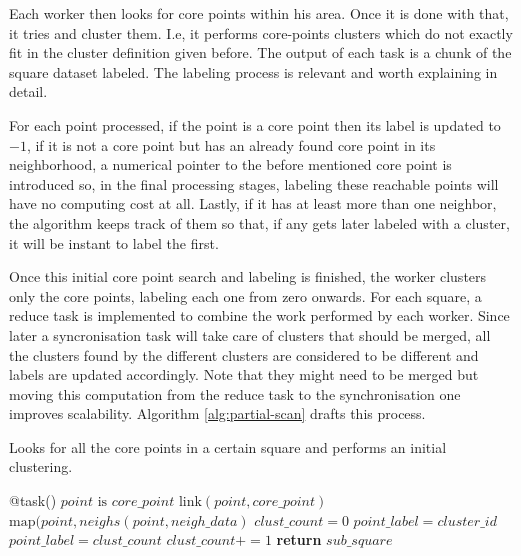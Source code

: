 \documentclass[10pt,journal,compsoc]{IEEEtran}
\let\MYoriglatexcaption\caption
\renewcommand{\caption}[2][\relax]{\MYoriglatexcaption[#2]{#2}}
\begin{document}
Each worker then looks for core points within his area. Once it is done with that, it tries and cluster them. I.e, it performs core-points clusters which do not exactly fit in the cluster definition given before. The output of each task is a chunk of the square dataset labeled. The labeling process is relevant and worth explaining in detail.

For each point processed, if the point is a core point then its label is updated to $-1$, if it is not a core point but has an already found core point in its neighborhood, a numerical pointer to the before mentioned core point is introduced so, in the final processing stages, labeling these reachable points will have no computing cost at all. Lastly, if it has at least more than one neighbor, the algorithm keeps track of them so that, if any gets later labeled with a cluster, it will be instant to label the first. 

Once this initial core point search and labeling is finished, the worker clusters only the core points, labeling each one from zero onwards. For each square, a reduce task is implemented to combine the work performed by each worker. Since later a syncronisation task will take care of clusters that should be merged, all the clusters found by the different clusters are considered to be different and labels are updated accordingly. Note that they might need to be merged but moving this computation from the reduce task to the synchronisation one improves scalability. Algorithm \ref{alg:partial-scan} drafts this process.

\begin{algorithm}
  \caption{Looks for all the core points in a certain square and performs an initial clustering. \label{alg:partial-scan}}
  \begin{algorithmic}[1]
    \State @task()
        \State {}
                \State $point \text{ is } core\_point $
                \Else
                    \State $\text{link}(point, core\_point)$
                \Else
                    \State $\text{map}(point, neighs(point, neigh\_data)$
                \EndIf
            \EndIf
        \EndFor
        \State {}
        \State $clust\_count = 0$
                \State $point\_label = cluster\_id$
            \Else 
                \State $point\_label = clust\_count$
                \State $clust\_count += 1$
            \EndIf
        \EndFor
        \State \textbf{return} $sub\_square$
    \EndFunction
  \end{algorithmic}
\end{algorithm}
\end{document}
